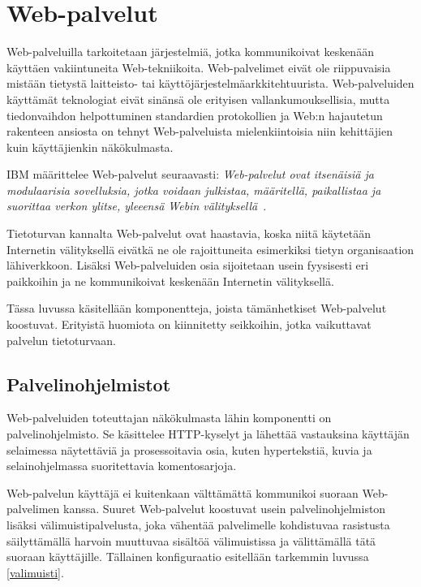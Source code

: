 
\chapter{Web-palvelut}

Web-palveluilla tarkoitetaan järjestelmiä, jotka kommunikoivat
keskenään käyttäen vakiintuneita Web-tekniikoita. Web-palvelimet eivät
ole riippuvaisia mistään tietystä laitteisto- tai
käyttöjärjestelmäarkkitehtuurista. Web-palveluiden käyttämät
teknologiat eivät sinänsä ole erityisen vallankumouksellisia, mutta
tiedonvaihdon helpottuminen standardien protokollien ja Web:n
hajautetun rakenteen ansiosta on tehnyt Web-palveluista
mielenkiintoisia niin kehittäjien kuin käyttäjienkin
näkökulmasta\cite{javaweb}.

IBM määrittelee Web-palvelut seuraavasti: \textit{Web-palvelut ovat
itsenäisiä ja modulaarisia sovelluksia, jotka voidaan julkistaa,
määritellä, paikallistaa ja suorittaa verkon ylitse, yleeensä Webin
välityksellä}~\cite{websecurity}.

Tietoturvan kannalta Web-palvelut ovat haastavia, koska niitä
käytetään Internetin välityksellä eivätkä ne ole rajoittuneita
esimerkiksi tietyn organisaation lähiverkkoon.
Lisäksi Web-palveluiden osia sijoitetaan usein fyysisesti eri paikkoihin ja ne
kommunikoivat keskenään Internetin välityksellä.

Tässa luvussa käsitellään komponentteja, joista tämänhetkiset
Web-palvelut koostuvat. Erityistä huomiota on kiinnitetty seikkoihin,
jotka vaikuttavat palvelun tietoturvaan.

\section{Palvelinohjelmistot}

Web-palveluiden toteuttajan näkökulmasta lähin komponentti on
palvelinohjelmisto. Se käsittelee HTTP-kyselyt ja lähettää vastauksina
käyttäjän selaimessa näytettäviä ja prosessoitavia osia, kuten
hypertekstiä, kuvia ja selainohjelmassa suoritettavia komentosarjoja.

Web-palvelun käyttäjä ei kuitenkaan välttämättä kommunikoi suoraan
Web-pal\-ve\-li\-men kanssa. Suuret Web-palvelut koostuvat usein
palvelinohjelmiston lisäksi välimuistipalvelusta, joka vähentää
palvelimelle kohdistuvaa rasistusta säilyttämällä harvoin muuttuvaa
sisältöä välimuistissa ja välittämällä tätä suoraan
käyttäjille. Tällainen konfiguraatio esitellään tarkemmin luvussa \ref{valimuisti}.

